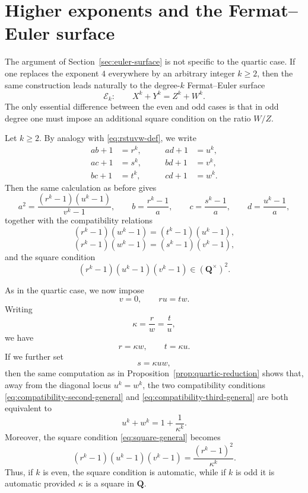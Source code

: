 \documentclass[11pt]{article}
\newcommand{\Q}{\mathbf{Q}}
\begin{document}
\section{Higher exponents and the Fermat--Euler surface}\label{sec:higher-exponents}

The argument of Section~\ref{sec:euler-surface} is not specific to the quartic case. 
If one replaces the exponent $4$ everywhere by an arbitrary integer $k\ge 2$, then the same construction leads naturally to the degree-$k$ Fermat--Euler surface
\[
\mathcal E_k:\qquad X^k+Y^k=Z^k+W^k.
\]
The only essential difference between the even and odd cases is that in odd degree one must impose an additional square condition on the ratio $W/Z$.

Let $k\ge 2$. By analogy with \eqref{eq:rstuvw-def}, we write
\begin{equation}\label{eq:rstuvw-def-general}
\begin{alignedat}{2}
ab+1&=r^k,  &\qquad ad+1&=u^k, \\
ac+1&=s^k,  &\qquad bd+1&=v^k, \\
bc+1&=t^k,  &\qquad cd+1&=w^k.
\end{alignedat}
\end{equation}
Then the same calculation as before gives
\begin{equation}\label{eq:abcd-from-rstuvw-general}
a^2=\frac{(r^k-1)(u^k-1)}{v^k-1},\qquad
b=\frac{r^k-1}{a},\qquad
c=\frac{s^k-1}{a},\qquad
d=\frac{u^k-1}{a},
\end{equation}
together with the compatibility relations
\begin{equation}\label{eq:compatibility-second-general}
(r^k-1)(w^k-1)=(t^k-1)(u^k-1),
\end{equation}
\begin{equation}\label{eq:compatibility-third-general}
(r^k-1)(w^k-1)=(s^k-1)(v^k-1),
\end{equation}
and the square condition
\begin{equation}\label{eq:square-general}
(r^k-1)(u^k-1)(v^k-1)\in (\Q^\times)^2.
\end{equation}

As in the quartic case, we now impose
\[
v=0,\qquad ru=tw.
\]
Writing
\[
\kappa=\frac{r}{w}=\frac{t}{u},
\]
we have
\[
r=\kappa w,\qquad t=\kappa u.
\]
If we further set
\[
s=\kappa uw,
\]
then the same computation as in Proposition~\ref{prop:quartic-reduction} shows that, away from the diagonal locus $u^k=w^k$, the two compatibility conditions \eqref{eq:compatibility-second-general} and \eqref{eq:compatibility-third-general} are both equivalent to
\begin{equation}\label{eq:general-special-ferm}
u^k+w^k=1+\frac{1}{\kappa^k}.
\end{equation}
Moreover, the square condition \eqref{eq:square-general} becomes
\begin{equation}\label{eq:general-square-special}
(r^k-1)(u^k-1)(v^k-1)=\frac{(r^k-1)^2}{\kappa^k}.
\end{equation}
Thus, if $k$ is even, the square condition is automatic, while if $k$ is odd it is automatic provided $\kappa$ is a square in $\Q$.
\end{document}
